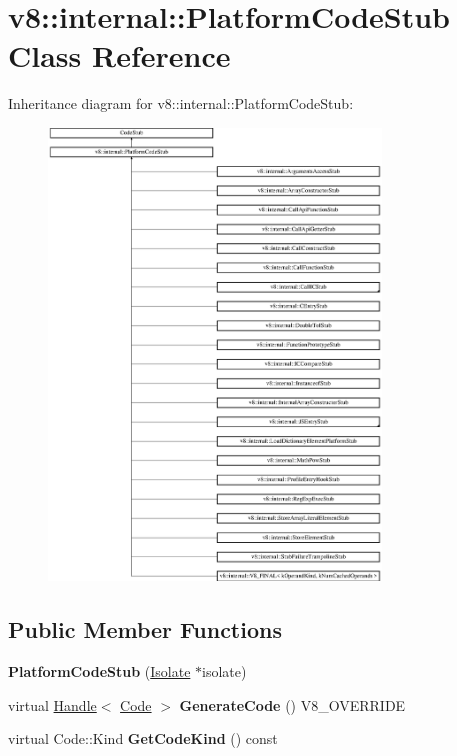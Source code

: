 \hypertarget{classv8_1_1internal_1_1_platform_code_stub}{}\section{v8\+:\+:internal\+:\+:Platform\+Code\+Stub Class Reference}
\label{classv8_1_1internal_1_1_platform_code_stub}
Inheritance diagram for v8\+:\+:internal\+:\+:Platform\+Code\+Stub\+:\begin{figure}[H]
\begin{center}
\leavevmode
\includegraphics[height=12.000000cm]{classv8_1_1internal_1_1_platform_code_stub}
\end{center}
\end{figure}
\subsection*{Public Member Functions}
\begin{DoxyCompactItemize}
\item 
\hypertarget{classv8_1_1internal_1_1_platform_code_stub_ab8e03282c98f4fc5087b2137e36da433}{}{\bfseries Platform\+Code\+Stub} (\hyperlink{classv8_1_1internal_1_1_isolate}{Isolate} $\ast$isolate)\label{classv8_1_1internal_1_1_platform_code_stub_ab8e03282c98f4fc5087b2137e36da433}

\item 
\hypertarget{classv8_1_1internal_1_1_platform_code_stub_ac24db283d9b868ac018b1e0b58ab234c}{}virtual \hyperlink{classv8_1_1internal_1_1_handle}{Handle}$<$ \hyperlink{classv8_1_1internal_1_1_code}{Code} $>$ {\bfseries Generate\+Code} () V8\+\_\+\+O\+V\+E\+R\+R\+I\+D\+E\label{classv8_1_1internal_1_1_platform_code_stub_ac24db283d9b868ac018b1e0b58ab234c}

\item 
\hypertarget{classv8_1_1internal_1_1_platform_code_stub_ae8e6902664052fcc8922887db5facc03}{}virtual Code\+::\+Kind {\bfseries Get\+Code\+Kind} () const \label{classv8_1_1internal_1_1_platform_code_stub_ae8e6902664052fcc8922887db5facc03}

\end{DoxyCompactItemize}
